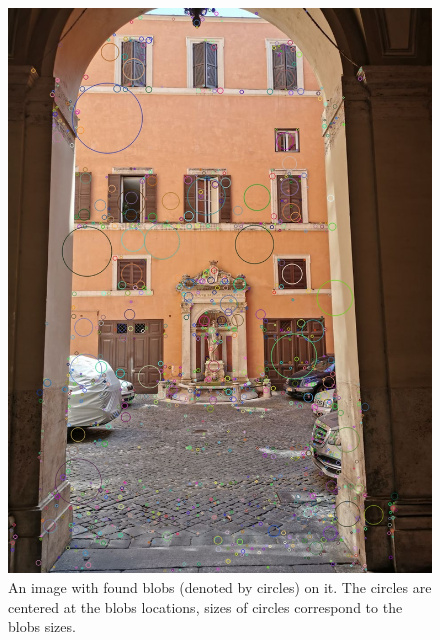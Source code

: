\documentclass[twocolumn]{svjour3}          %
\begin{document}
\begin{figure}[!h]
\setlength{\lineskip}{0pt}
\vspace{-4.0cm}
  \centering
   \includegraphics[scale=0.35,natwidth=960,natheight=1280]{10.jpg} 
  \caption{An image with found blobs (denoted by circles) on it. The circles are centered at the blobs locations, sizes of circles correspond to the blobs sizes.}
  \label{fig:example2}
 \end{figure} 
\end{document}
